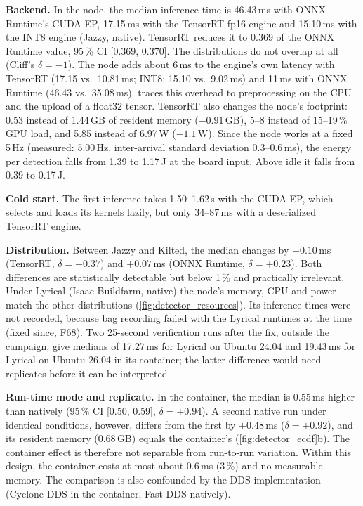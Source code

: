 \documentclass[11pt,a4paper]{article}
\newcommand{\finding}[1]{\textsf{\small F#1}}
\begin{document}
\textbf{Backend.} In the node, the median inference time is 46.43\,ms with ONNX Runtime's CUDA EP, 17.15\,ms with the
TensorRT fp16 engine and 15.10\,ms with the INT8 engine (Jazzy, native). TensorRT reduces it to 0.369 of the ONNX
Runtime value, 95\,\% CI [0.369, 0.370]. The distributions do not overlap at all (Cliff's $\delta = -1$). The node
adds about 6\,ms to the engine's own latency with TensorRT (17.15 vs.\ 10.81\,ms; INT8: 15.10 vs.\ 9.02\,ms) and
11\,ms with ONNX Runtime (46.43 vs.\ 35.08\,ms).  traces this overhead to preprocessing on the CPU and
the upload of a float32 tensor. TensorRT also changes the node's footprint: 0.53 instead of 1.44\,GB of resident
memory ($-0.91$\,GB), 5--8 instead of 15--19\,\% GPU load, and 5.85 instead of 6.97\,W ($-1.1$\,W). Since the node
works at a fixed 5\,Hz (measured: 5.00\,Hz, inter-arrival standard deviation 0.3--0.6\,ms), the energy per
detection falls from 1.39 to 1.17\,J at the board input. Above idle it falls from 0.39 to 0.17\,J.

\textbf{Cold start.} The first inference takes 1.50--1.62\,s with the CUDA EP, which selects and loads its kernels
lazily, but only 34--87\,ms with a deserialized TensorRT engine.

\textbf{Distribution.} Between Jazzy and Kilted, the median changes by $-0.10$\,ms (TensorRT, $\delta = -0.37$) and
$+0.07$\,ms (ONNX Runtime, $\delta = +0.23$). Both differences are statistically detectable but below 1\,\% and
practically irrelevant. Under Lyrical (Isaac Buildfarm, native) the node's memory, CPU and power match the other
distributions (\cref{fig:detector_resources}). Its inference times were not recorded, because bag recording failed
with the Lyrical runtimes at the time (fixed since, \finding{68}). Two 25-second verification runs after the fix, outside
the campaign, give medians of 17.27\,ms for Lyrical on Ubuntu 24.04 and 19.43\,ms for Lyrical on Ubuntu 26.04 in its
container; the latter difference would need replicates before it can be interpreted.

\textbf{Run-time mode and replicate.} In the container, the median is 0.55\,ms higher than natively (95\,\% CI
[0.50, 0.59], $\delta = +0.94$). A second native run under identical conditions, however, differs from the first by
$+0.48$\,ms ($\delta = +0.92$), and its resident memory (0.68\,GB) equals the container's
(\cref{fig:detector_ecdf}b). The container effect is therefore not separable from run-to-run variation. Within this
design, the container costs at most about 0.6\,ms (3\,\%) and no measurable memory. The comparison is also confounded
by the DDS implementation (Cyclone DDS in the container, Fast DDS natively).
\end{document}
